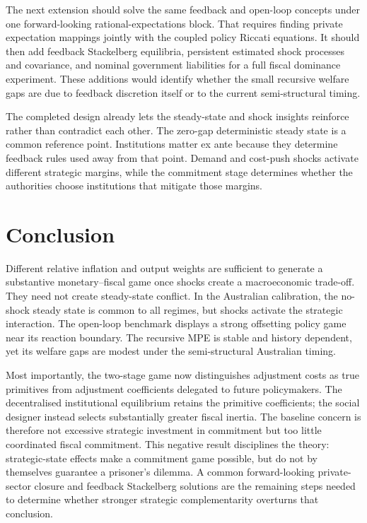 \documentclass[11pt]{article}
\begin{document}
The next extension should solve the same feedback and open-loop concepts under
one forward-looking rational-expectations block.  That requires finding private
expectation mappings jointly with the coupled policy Riccati equations.  It
should then add feedback Stackelberg equilibria, persistent estimated shock
processes and covariance, and nominal government liabilities for a full fiscal
dominance experiment.  These additions would identify whether the small
recursive welfare gaps are due to feedback discretion itself or to the current
semi-structural timing.

The completed design already lets the steady-state and shock insights reinforce
rather than contradict each other.  The zero-gap deterministic steady state is
a common reference point.  Institutions matter ex ante because they determine
feedback rules used away from that point.  Demand and cost-push shocks activate
different strategic margins, while the commitment stage determines whether
the authorities choose institutions that mitigate those margins.

\section{Conclusion}

Different relative inflation and output weights are sufficient to generate a
substantive monetary--fiscal game once shocks create a macroeconomic trade-off.
They need not create steady-state conflict.  In the Australian calibration,
the no-shock steady state is common to all regimes, but shocks activate the
strategic interaction.  The open-loop benchmark displays a strong offsetting
policy game near its reaction boundary.  The recursive MPE is stable and
history dependent, yet its welfare gaps are modest under the semi-structural
Australian timing.

Most importantly, the two-stage game now distinguishes adjustment costs as
true primitives from adjustment coefficients delegated to future policymakers.
The decentralised institutional equilibrium retains the primitive coefficients;
the social designer instead selects substantially greater fiscal inertia.  The
baseline concern is therefore not excessive strategic investment in commitment
but too little coordinated fiscal commitment.  This negative result disciplines
the theory: strategic-state effects make a commitment game possible, but do not
by themselves guarantee a prisoner's dilemma.  A common forward-looking
private-sector closure and feedback Stackelberg solutions are the remaining
steps needed to determine whether stronger strategic complementarity overturns
that conclusion.
\end{document}
